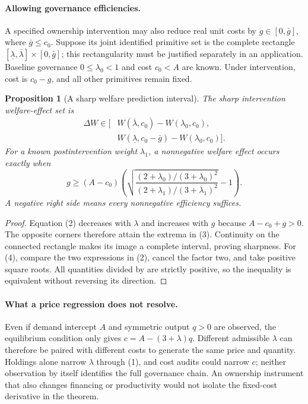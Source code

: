 \documentclass[11pt]{article}
\newtheorem{proposition}[theorem]{Proposition}
\theoremstyle{definition}
\begin{document}
\paragraph{Allowing governance efficiencies.}
A specified ownership intervention may also reduce real unit costs by $g\in[0,\bar g]$, where $\bar g\leq c_0$. Suppose its joint identified primitive set is the complete rectangle
$[\underline\lambda,\overline\lambda]\times[0,\bar g]$; this rectangularity must be justified separately in an application. Baseline governance $0\leq\lambda_0<1$ and cost $c_0<A$ are known. Under intervention, cost is $c_0-g$, and all other primitives remain fixed.

\begin{proposition}[A sharp welfare prediction interval]
The sharp intervention welfare-effect set is
\[
 \begin{split}
 \Delta W\in[&W(\overline\lambda,c_0)-W(\lambda_0,c_0),\\
             &W(\underline\lambda,c_0-\bar g)-W(\lambda_0,c_0)].
 \end{split}
 \tag{3}
\]
For a known postintervention weight $\lambda_1$, a nonnegative welfare effect occurs exactly when
\[
 g\geq (A-c_0)\left(
 \sqrt{\frac{(2+\lambda_0)/(3+\lambda_0)^2}
 {(2+\lambda_1)/(3+\lambda_1)^2}}-1\right).
 \tag{4}
\]
A negative right side means every nonnegative efficiency suffices.
\end{proposition}
\begin{proof}
Equation (2) decreases with $\lambda$ and increases with $g$ because $A-c_0+g>0$. The opposite corners therefore attain the extrema in (3). Continuity on the connected rectangle makes its image a complete interval, proving sharpness. For (4), compare the two expressions in (2), cancel the factor two, and take positive square roots. All quantities divided by are strictly positive, so the inequality is equivalent without reversing its direction.
\end{proof}

\paragraph{What a price regression does not resolve.}
Even if demand intercept $A$ and symmetric output $q>0$ are observed, the equilibrium condition only gives $c=A-(3+\lambda)q$. Different admissible $\lambda$ can therefore be paired with different costs to generate the same price and quantity. Holdings alone narrow $\lambda$ through (1), and cost audits could narrow $c$; neither observation by itself identifies the full governance chain. An ownership instrument that also changes financing or productivity would not isolate the fixed-cost derivative in the theorem.
\end{document}
